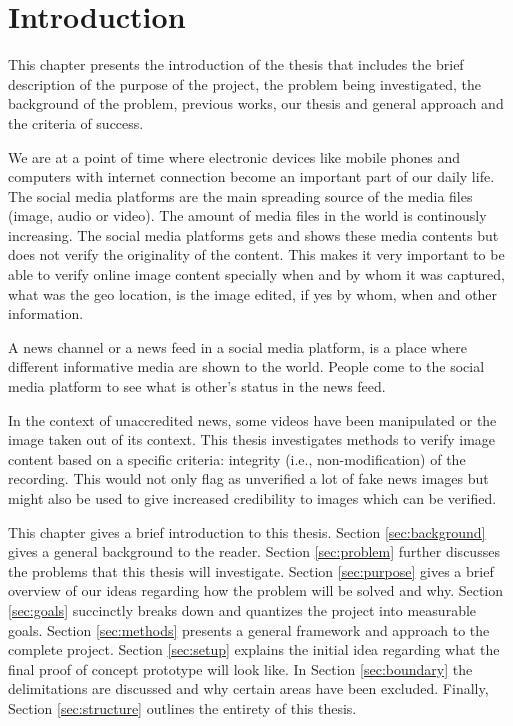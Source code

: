 \chapter{Introduction}
\label{ch:1}

\bigskip
\bigskip
\bigskip

This chapter presents the introduction of the thesis that includes the brief description of the purpose of the project, the problem being investigated, the background of the problem, previous works, our thesis and general approach and the criteria of success.

We are at a point of time where electronic devices like mobile phones and computers with internet connection become an important part of our daily life. The social media platforms are the main spreading source of the media files (image, audio or video). The amount of media files in the world is continously increasing. The social media platforms gets and shows these media contents but does not verify the originality of the content. This makes it very important to be able to verify online image content specially when and by whom it was captured, what was the geo location, is the image edited, if yes by whom, when and other information.

A news channel or a news feed in a social media platform, is a place where different informative media are shown to the world. People come to the social media platform to see what is other's status in the news feed.

In the context of unaccredited news, some videos have been manipulated or the image taken out of its context. This thesis investigates methods to verify image content based on a specific criteria: integrity (i.e., non-modification) of the recording. This would not only flag as unverified a lot of fake news images but might also be used to give increased credibility to images which can be verified.

This chapter gives a brief introduction to this thesis.
Section \ref{sec:background} gives a general background to the reader.
Section \ref{sec:problem} further discusses the problems that this thesis will investigate.
Section \ref{sec:purpose} gives a brief overview of our ideas regarding how the problem will be solved and why.
Section \ref{sec:goals} succinctly breaks down and quantizes the project into measurable goals.
Section \ref{sec:methods} presents a general framework and approach to the complete project.
Section \ref{sec:setup} explains the initial idea regarding what the final proof of concept prototype will look like.
In Section \ref{sec:boundary} the delimitations are discussed and why certain areas have been excluded.
Finally, Section \ref{sec:structure} outlines the entirety of this thesis.

